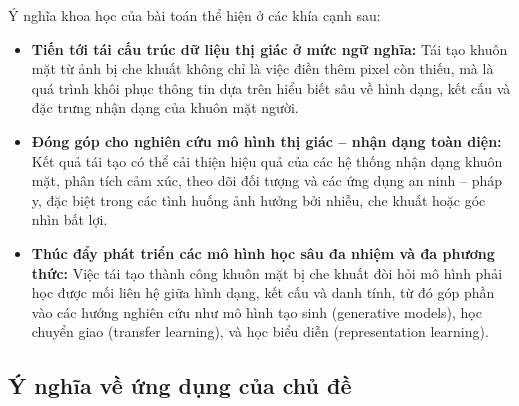 \documentclass[12pt,a4paper]{article}
\begin{document}
	Ý nghĩa khoa học của bài toán thể hiện ở các khía cạnh sau:
	\begin{itemize}
		\item \textbf{Tiến tới tái cấu trúc dữ liệu thị giác ở mức ngữ nghĩa:} Tái tạo khuôn mặt từ ảnh bị che khuất không chỉ là việc điền thêm pixel còn thiếu, mà là quá trình khôi phục thông tin dựa trên hiểu biết sâu về hình dạng, kết cấu và đặc trưng nhận dạng của khuôn mặt người.
		\item \textbf{Đóng góp cho nghiên cứu mô hình thị giác – nhận dạng toàn diện:} Kết quả tái tạo có thể cải thiện hiệu quả của các hệ thống nhận dạng khuôn mặt, phân tích cảm xúc, theo dõi đối tượng và các ứng dụng an ninh – pháp y, đặc biệt trong các tình huống ảnh hưởng bởi nhiễu, che khuất hoặc góc nhìn bất lợi.
		\item \textbf{Thúc đẩy phát triển các mô hình học sâu đa nhiệm và đa phương thức:} Việc tái tạo thành công khuôn mặt bị che khuất đòi hỏi mô hình phải học được mối liên hệ giữa hình dạng, kết cấu và danh tính, từ đó góp phần vào các hướng nghiên cứu như mô hình tạo sinh (generative models), học chuyển giao (transfer learning), và học biểu diễn (representation learning).
	\end{itemize}
	
	\subsection{Ý nghĩa về ứng dụng của chủ đề}
	
\end{document}
